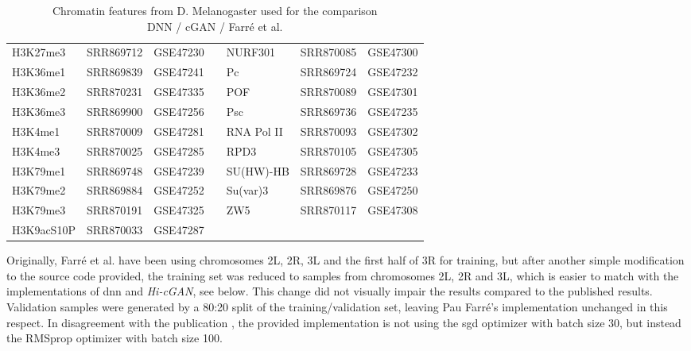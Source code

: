 \begin{table}[htb]
\begin{tabular}{lllllll}
H3K27me3         & SRR869712           & GSE47230         &  & NURF301          & SRR870085 & GSE47300 \\
H3K36me1         & SRR869839           & GSE47241         &  & Pc               & SRR869724 & GSE47232 \\
H3K36me2         & SRR870231           & GSE47335         &  & POF              & SRR870089 & GSE47301 \\
H3K36me3         & SRR869900           & GSE47256         &  & Psc              & SRR869736 & GSE47235 \\
H3K4me1          & SRR870009           & GSE47281         &  & RNA Pol II       & SRR870093 & GSE47302 \\
H3K4me3          & SRR870025           & GSE47285         &  & RPD3             & SRR870105 & GSE47305 \\
H3K79me1         & SRR869748           & GSE47239         &  & SU(HW)-HB        & SRR869728 & GSE47233 \\
H3K79me2         & SRR869884           & GSE47252         &  & Su(var)3         & SRR869876 & GSE47250 \\
H3K79me3         & SRR870191           & GSE47325         &  & ZW5              & SRR870117 & GSE47308 \\
H3K9acS10P       & SRR870033           & GSE47287         &  &                  &           &          \\ \hline
\end{tabular}
\caption[Chromatin features from D. Melanogaster used for the comparison DNN / cGAN / Farré et al. \cite{Farre2018a}]{Chromatin features from D. Melanogaster used for the comparison\\DNN / cGAN / Farré et al. \cite{Farre2018a}}
\label{tab:methods:features_farre}
\end{table}

Originally, Farré et al. have been using chromosomes 2L, 2R, 3L and the first half of 3R for training, 
but after another simple modification to the source code provided, the training set was reduced to samples from chromosomes 2L, 2R and 3L,
which is easier to match with the implementations of \acrshort{dnn} and \emph{Hi-cGAN}, see below. 
This change did not visually impair the results compared to the published results.
Validation samples were generated by a 80:20 split of the training/validation set, leaving Pau Farr\'e's implementation unchanged in this respect.
In disagreement with the publication \cite{Farre2018a}, the provided implementation is not using the \acrshort{sgd} optimizer with batch size 30,
but instead the RMSprop optimizer with batch size 100.

